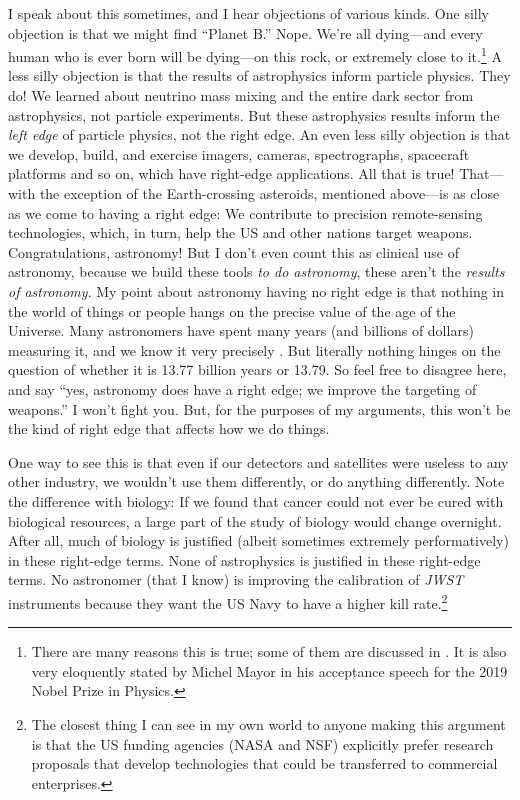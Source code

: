 \documentclass{article}
\begin{document}
I speak about this sometimes, and I hear objections of various kinds.
One silly objection is that we might find ``Planet B.''
Nope. We're all dying---and every human who is ever born will be dying---on this rock, or extremely close to it.\footnote{There are many reasons this is true; some of them are discussed in \cite{marssux}. It is also very eloquently stated by Michel Mayor in his acceptance speech for the 2019 Nobel Prize in Physics.}
A less silly objection is that the results of astrophysics inform particle physics.
They do!
We learned about neutrino mass mixing and the entire dark sector from astrophysics, not particle experiments.
But these astrophysics results inform the \emph{left edge} of particle physics, not the right edge.
An even less silly objection is that we develop, build, and exercise imagers, cameras, spectrographs, spacecraft platforms and so on, which have right-edge applications.
All that is true!
That---with the exception of the Earth-crossing asteroids, mentioned above---is as close as we come to having a right edge:
We contribute to precision remote-sensing technologies, which, in turn, help the US and other nations target weapons.
Congratulations, astronomy!
But I don't even count this as clinical use of astronomy, because we build these tools \emph{to do astronomy}, these aren't the \emph{results of astronomy}.
My point about astronomy having no right edge is that nothing in the world of things or people hangs on the precise value of the age of the Universe.
Many astronomers have spent many years (and billions of dollars) measuring it, and we know it very precisely \cite{age}.
But literally nothing hinges on the question of whether it is 13.77 billion years or 13.79.
So feel free to disagree here, and say ``yes, astronomy does have a right edge; we improve the targeting of weapons.''
I won't fight you.
But, for the purposes of my arguments, this won't be the kind of right edge that affects how we do things.

One way to see this is that even if our detectors and satellites were useless to any other industry,
we wouldn't use them differently, or do anything differently.
Note the difference with biology: If we found that cancer could not ever be cured with biological resources, a large part of the study of biology would change overnight.
After all, much of biology is justified (albeit sometimes extremely performatively) in these right-edge terms.
None of astrophysics is justified in these right-edge terms.
No astronomer (that I know) is improving the calibration of \textsl{JWST} instruments because they want the US Navy to have a higher kill rate.\footnote{%
The closest thing I can see in my own world to anyone making this argument is that the US funding agencies (NASA and NSF) explicitly prefer research proposals that develop technologies that could be transferred to commercial enterprises.}
\end{document}
